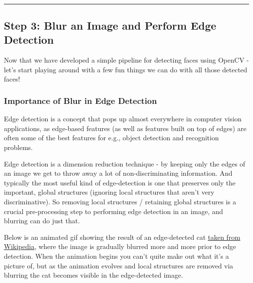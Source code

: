 \documentclass[11pt]{article}
\begin{document}
    \begin{center}
    \end{center}
    { \hspace*{\fill} \\}
    
    \begin{center}\rule{0.5\linewidth}{\linethickness}\end{center}

\subsection{Step 3: Blur an Image and Perform Edge
Detection}\label{step-3-blur-an-image-and-perform-edge-detection}

    Now that we have developed a simple pipeline for detecting faces using
OpenCV - let's start playing around with a few fun things we can do with
all those detected faces!

    \subsubsection{Importance of Blur in Edge
Detection}\label{importance-of-blur-in-edge-detection}

Edge detection is a concept that pops up almost everywhere in computer
vision applications, as edge-based features (as well as features built
on top of edges) are often some of the best features for e.g., object
detection and recognition problems.

Edge detection is a dimension reduction technique - by keeping only the
edges of an image we get to throw away a lot of non-discriminating
information. And typically the most useful kind of edge-detection is one
that preserves only the important, global structures (ignoring local
structures that aren't very discriminative). So removing local
structures / retaining global structures is a crucial pre-processing
step to performing edge detection in an image, and blurring can do just
that.

Below is an animated gif showing the result of an edge-detected cat
\href{https://en.wikipedia.org/wiki/Gaussian_blur\#Common_uses}{taken
from Wikipedia}, where the image is gradually blurred more and more
prior to edge detection. When the animation begins you can't quite make
out what it's a picture of, but as the animation evolves and local
structures are removed via blurring the cat becomes visible in the
edge-detected image.
\end{document}
